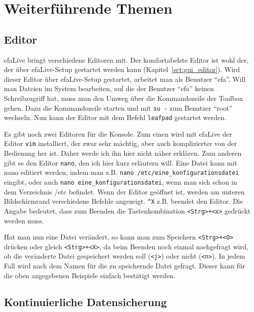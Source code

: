 \documentclass[a4paper,12pt,twoside]{article}
\begin{document}
\section{Weiterführende Themen}
\label{sct:weitere_themen}
\subsection{Editor}
\label{sct:editor}
efaLive bringt verschiedene Editoren
mit. Der komfortabelste Editor ist wohl der, der über efaLive-Setup
gestartet werden kann (Kapitel~\ref{sct:gui_editor}).
Wird dieser Editor über efaLive-Setup gestartet, arbeitet man als
Benutzer "`efa"'. Will man Dateien im System
bearbeiten, auf die der Benutzer "`efa"'
keinen Schreibzugriff hat, muss man den Umweg über die Kommandozeile
der Toolbox gehen. Dazu die Kommandozeile starten und mit
\texttt{su -} zum Benutzer
"`root"' wechseln. Nun kann der Editor mit
dem Befehl \texttt{leafpad} gestartet werden.

Es gibt noch zwei Editoren für die Konsole. Zum einen wird mit efaLive
der Editor \texttt{vim} installiert, der zwar sehr
mächtig, aber auch komplizierter von der Bedienung her ist. Daher werde
ich ihn hier nicht näher erklären. Zum anderen gibt es den Editor
\texttt{nano}, den ich hier kurz erläutern will.
Eine Datei kann mit nano editiert werden, indem man z.B.
\texttt{nano /etc/eine\_konfigurationsdatei}
eingibt, oder auch \texttt{nano eine\_konfigurationsdatei},
wenn man sich schon in dem Verzeichnis /etc befindet. Wenn
der Editor geöffnet ist, werden am unteren Bildschirmrand verschiedene
Befehle angezeigt. \texttt{\^{}X} z.B. beendet den
Editor. Die Angabe bedeutet, dass zum Beenden die Tastenkombination
\texttt{{\textless}Strg{\textgreater}+{\textless}x{\textgreater}} gedrückt
werden muss.

Hat man nun eine Datei verändert, so kann man zum Speichern
\texttt{{\textless}Strg{\textgreater}+{\textless}O{\textgreater}} drücken oder
gleich \texttt{{\textless}Strg{\textgreater}+{\textless}X{\textgreater}}, da
beim Beenden noch einmal nachgefragt wird, ob die veränderte Datei
gespeichert werden soll (\texttt{{\textless}j{\textgreater}}) oder nicht
(\texttt{{\textless}n{\textgreater}}). In jedem Fall wird nach dem Namen für die
zu speichernde Datei gefragt. Dieser kann für die oben angegebenen
Beispiele einfach bestätigt werden.


\subsection{Kontinuierliche Datensicherung}
\label{sct:kont_backup}
\end{document}

